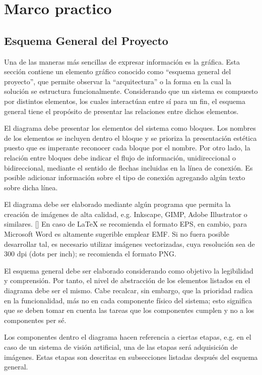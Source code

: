 \chapter{Marco practico}
\label{sec:practico}
\section{Esquema General del Proyecto}
Una de las maneras más sencillas de expresar información es la gráfica. Esta sección contiene un elemento gráfico conocido como “esquema general del proyecto”, que permite observar la “arquitectura” o la forma en la cual la solución se estructura funcionalmente. Considerando que un sistema es compuesto por distintos elementos, los cuales interactúan entre sí para un fin, el esquema general tiene el propósito de presentar las relaciones entre dichos elementos.

El diagrama debe presentar los elementos del sistema como bloques. Los nombres de los elementos se incluyen dentro el bloque y se prioriza la presentación estética puesto que es imperante reconocer cada bloque por el nombre. Por otro lado, la relación entre bloques debe indicar el flujo de información, unidireccional o bidireccional, mediante el sentido de flechas incluidas en la línea de conexión. Es posible adicionar información sobre el tipo de conexión agregando algún texto sobre dicha línea. 

El diagrama debe ser elaborado mediante algún programa que permita la creación de imágenes de alta calidad, e.g. Inkscape, GIMP, Adobe Illustrator o similares. [\cite{lynch2005where}] En caso de LaTeX se recomienda el formato EPS, en cambio, para Microsoft Word es altamente sugerible emplear EMF. Si no fuera posible desarrollar tal, es necesario utilizar imágenes vectorizadas, cuya resolución sea de 300 dpi (dots per inch); se recomienda el formato PNG.

El esquema general debe ser elaborado considerando como objetivo la legibilidad y comprensión. Por tanto, el nivel de abstracción de los elementos listados en el diagrama debe ser el mismo. Cabe recalcar, sin embargo, que la prioridad radica en la funcionalidad, más no en cada componente físico del sistema; esto significa que se deben tomar en cuenta las tareas que los componentes cumplen y no a los componentes per sé.

Los componentes dentro el diagrama hacen referencia a ciertas etapas, e.g. en el caso de un sistema de visión artificial, una de las etapas será adquisición de imágenes. Estas etapas son descritas en subsecciones listadas después del esquema general. 

